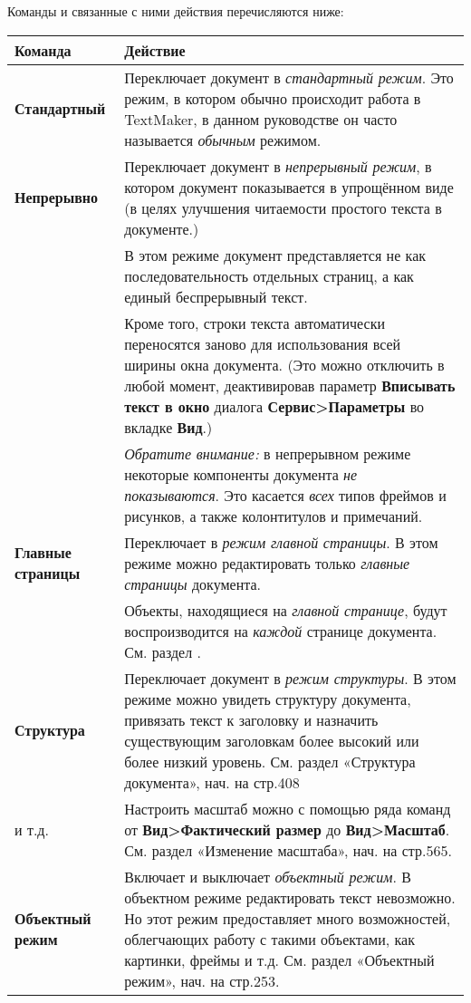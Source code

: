 ﻿\documentclass[a4paper,10pt]{article}
\begin{document}
 Команды и связанные с ними действия перечисляются ниже:
 \newline
 \newline
 \begin{longtable}{  m{4cm}  m{12cm}  }  
 \textbf{Команда} & \textbf{Действие}\\ 
 \hline
  \textbf{Стандартный} & Переключает документ в \textit{стандартный режим}. Это режим, в котором обычно происходит работа в TextMaker, в данном руководстве он часто называется \textit{обычным} режимом.\\
  \hline
  \textbf{Непрерывно} & Переключает документ в \textit{непрерывный режим}, в котором документ показывается в упрощённом виде (в целях улучшения читаемости простого текста в документе.)\\ 
  \textbf{} & В этом режиме документ представляется не как последовательность отдельных страниц, а как единый беспрерывный текст.\\
\textbf{} & Кроме того, строки текста автоматически переносятся заново для использования всей ширины окна документа. (Это можно отключить в любой момент, деактивировав параметр \textbf{Вписывать текст в окно} диалога \textbf{Сервис>Параметры} во вкладке \textbf{Вид}.)\\
 & \textit{Обратите внимание:} в непрерывном режиме некоторые компоненты документа \textit{не показываются}. Это касается \textit{всех} типов фреймов и рисунков, а также колонтитулов и примечаний.\\ 
 \hline
 \textbf{Главные страницы} & Переключает в \textit{режим главной страницы}. В этом режиме можно редактировать только \textit{главные страницы} документа.\\
   & Объекты, находящиеся на \textit{главной странице}, будут воспроизводится на \textit{каждой} странице документа. См. раздел \nameref{sec:главнстраницы}.\\
  \hline
  \textbf{Структура} & Переключает документ в \textit{режим структуры}. В этом режиме можно увидеть структуру документа, привязать текст к заголовку и назначить существующим заголовкам более высокий или более низкий уровень. См. раздел «Структура документа», нач. на стр.408\\
  \hline
  \textbf{\index{Фактический размер}} и т.д. & Настроить масштаб можно с помощью ряда команд от \textbf{Вид>Фактический размер} до \textbf{Вид>Масштаб}. См. раздел «Изменение масштаба», нач. на стр.565.\\
  \hline
  \textbf{Объектный режим} & Включает и выключает \textit{объектный режим}. В объектном режиме редактировать текст невозможно. Но этот режим предоставляет много возможностей, облегчающих работу с такими объектами, как картинки, фреймы и т.д. См. раздел «Объектный режим», нач. на стр.253.\\

\end{longtable}
\end{document}
